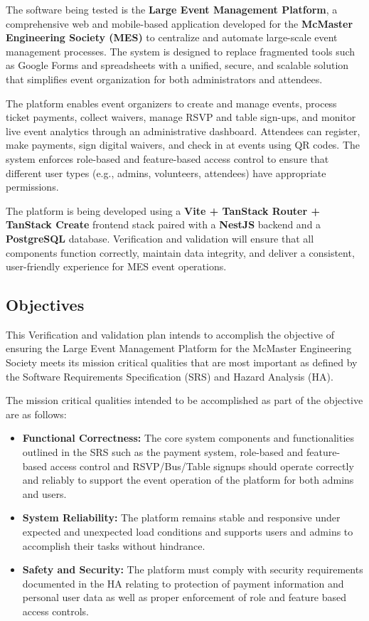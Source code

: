 \documentclass[12pt, titlepage]{article}
\begin{document}
The software being tested is the \textbf{Large Event Management Platform}, a comprehensive web and mobile-based application developed for the \textbf{McMaster Engineering Society (MES)} to centralize and automate large-scale event management processes. The system is designed to replace fragmented tools such as Google Forms and spreadsheets with a unified, secure, and scalable solution that simplifies event organization for both administrators and attendees.

The platform enables event organizers to create and manage events, process ticket payments, collect waivers, manage RSVP and table sign-ups, and monitor live event analytics through an administrative dashboard. Attendees can register, make payments, sign digital waivers, and check in at events using QR codes. The system enforces role-based and feature-based access control to ensure that different user types (e.g., admins, volunteers, attendees) have appropriate permissions.

The platform is being developed using a \textbf{Vite + TanStack Router + TanStack Create} frontend stack paired with a \textbf{NestJS} backend and a \textbf{PostgreSQL} database. Verification and validation will ensure that all components function correctly, maintain data integrity, and deliver a consistent, user-friendly experience for MES event operations.

\subsection{Objectives}
This Verification and validation plan intends to accomplish the objective of ensuring the Large Event Management Platform for the McMaster Engineering Society meets its mission critical qualities that are most important as defined by the Software Requirements Specification (SRS) and Hazard Analysis (HA).

The mission critical qualities intended to be accomplished as part of the objective are as follows:
\begin{itemize}
    \item \textbf{Functional Correctness:} The core system components and functionalities outlined in the SRS such as the payment system, role-based and feature-based access control and RSVP/Bus/Table signups should operate correctly and reliably to support the event operation of the platform for both admins and users.
    \item \textbf{System Reliability:} The platform remains stable and responsive under expected and unexpected load conditions and supports users and admins to accomplish their tasks without hindrance.
    \item \textbf{Safety and Security:} The platform must comply with security requirements documented in the HA relating to protection of payment information and personal user data as well as proper enforcement of role and feature based access controls.    
\end{itemize}
\end{document}
